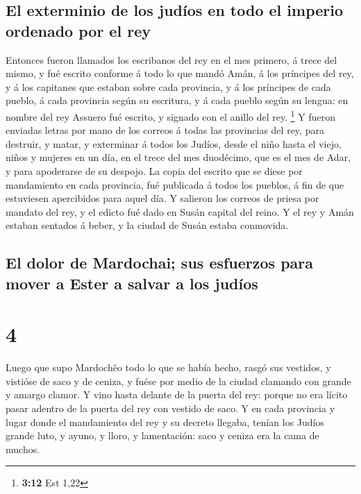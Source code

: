 \hypertarget{el-exterminio-de-los-juduxedos-en-todo-el-imperio-ordenado-por-el-rey}{%
\subsection{El exterminio de los judíos en todo el imperio ordenado por
el
rey}\label{el-exterminio-de-los-juduxedos-en-todo-el-imperio-ordenado-por-el-rey}}

 Entonces fueron llamados los escribanos del rey en el
mes primero, á trece del mismo, y fué escrito conforme á todo lo que
mandó Amán, á los príncipes del rey, y á los capitanes que estaban sobre
cada provincia, y á los príncipes de cada pueblo, á cada provincia según
su escritura, y á cada pueblo según su lengua: en nombre del rey Assuero
fué escrito, y signado con el anillo del rey. \footnote{\textbf{3:12}
  Est 1,22}  Y fueron enviadas letras por mano de los
correos á todas las provincias del rey, para destruir, y matar, y
exterminar á todos los Judíos, desde el niño hasta el viejo, niños y
mujeres en un día, en el trece del mes duodécimo, que es el mes de Adar,
y para apoderarse de su despojo.  La copia del escrito
que se diese por mandamiento en cada provincia, fué publicada á todos
los pueblos, á fin de que estuviesen apercibidos para aquel día.
 Y salieron los correos de priesa por mandato del rey, y
el edicto fué dado en Susán capital del reino. Y el rey y Amán estaban
sentados á beber, y la ciudad de Susán estaba conmovida.

\hypertarget{el-dolor-de-mardochai-sus-esfuerzos-para-mover-a-ester-a-salvar-a-los-juduxedos}{%
\subsection{El dolor de Mardochai; sus esfuerzos para mover a Ester a
salvar a los
judíos}\label{el-dolor-de-mardochai-sus-esfuerzos-para-mover-a-ester-a-salvar-a-los-juduxedos}}

\hypertarget{section-3}{%
\section{4}\label{section-3}}

 Luego que supo Mardochêo todo lo que se había hecho,
rasgó sus vestidos, y vistióse de saco y de ceniza, y fuése por medio de
la ciudad clamando con grande y amargo clamor.  Y vino
hasta delante de la puerta del rey: porque no era lícito pasar adentro
de la puerta del rey con vestido de saco.  Y en cada
provincia y lugar donde el mandamiento del rey y su decreto llegaba,
tenían los Judíos grande luto, y ayuno, y lloro, y lamentación: saco y
ceniza era la cama de muchos.

